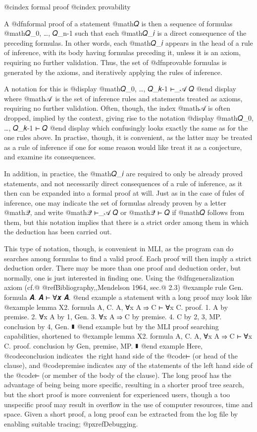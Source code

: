 @cindex formal proof
@cindex provability

A @dfn{formal proof} of a statement @math{𝑄} is then a sequence of formulas @math{𝑄_0, …, 𝑄_{n-1}} such that each @math{𝑄_𝑖} is a direct consequence of the preceding formulas. In other words, each @math{𝑄_𝑖} appears in the head of a rule of inference, with its body having formulas preceding it, unless it is an axiom, requiring no further validation. Thus, the set of @dfn{provable} formulas is generated by the axioms, and iteratively applying the rules of inference.

A notation for this is
@display
@math{𝑄_0, …, 𝑄_{𝑘-1} ⊢_𝒜 𝑄}
@end display
where @math{𝒜} is the set of inference rules and statements treated as axioms, requiring no further validation. Often, though, the index @math{𝒜} is often dropped, implied by the context, giving rise to the notation
@display
@math{𝑄_0, …, 𝑄_{𝑘-1} ⊢ 𝑄}
@end display
which confusingly looks exactly the same as for the one rules above. In practise, though, it is convenient, as the latter may be treated as a rule of inference if one for some reason would like treat it as a conjecture, and examine its consequences.

In addition, in practice, the @math{𝑄_𝑖} are required to only be already proved statements, and not necessarily direct consequences of a rule of inference, as it then can be expanded into a formal proof at will. Just as in the case of fules of inference, one may indicate the set of formulas already proven by a letter @math{𝒬}, and write @math{𝒬 ⊢_𝒜 𝑄} or @math{𝒬 ⊢ 𝑄} if @math{𝑄} follows from them, but this notation implies that there is a strict order among them in which the deduction has been carried out.

This type of notation, though, is convenient in MLI, as the program can do searches among formulas to find a valid proof. Each proof will then imply a strict deduction order. There may be more than one proof and deduction order, but normally, one is just interested in finding one.
Using the @dfn{generalization axiom} (cf.@ @ref{Bibliography,,Mendelson 1964}, sec.@ 2.3)
@example
rule Gen. formula 𝑨. 𝑨 ⊢ ∀𝒙 𝑨.
@end example
a statement with a long proof may look like
@example
lemma X2. formula A, C.
  A, ∀x A ⇒ C ⊢ ∀x C.
proof.
  1. A by premise.
  2. ∀x A by 1, Gen.
  3. ∀x A ⇒ C by premise.
  4. C by 2, 3, MP.
  conclusion by 4, Gen.
∎
@end example
but by the MLI proof searching capabilities, shortened to
@example
lemma X2. formula A, C.
  A, ∀x A ⇒ C ⊢ ∀x C.
proof.
  conclusion by Gen, premise, MP.
∎
@end example
Here, @code{conclusion} indicates the right hand side of the @code{⊢} (or head of the clause), and @code{premise} indicates any of the statements of the left hand side of the @code{⊢} (or member of the body of the clause). The long proof has the advantage of being being more specific, resulting in a shorter proof tree search, but the short proof is more convenient for experienced users, though a too unspecific proof may result in overflow in the use of computer resources, time and space. Given a short proof, a long proof can be extracted from the log file by enabling suitable tracing; @pxref{Debugging}.

